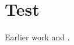 \documentclass{article}
\begin{document}
\section{Test}\label{sec:test}
Earlier work  and .


\end{document}
